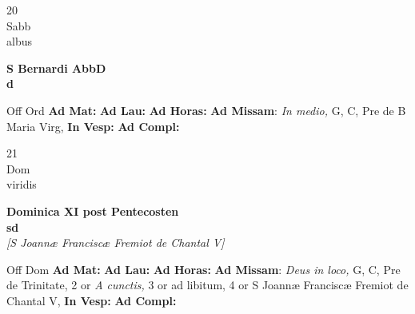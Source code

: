 \documentclass[10pt, openany]{book}
\begin{document}
        \begin{center}
            \begin{minipage}{3.5in}
                \vspace{2em}
                \begin{minipage}{0.5in}
                    {\Huge 20} \\
                    {\normalsize Sabb} \\
                    {\normalsize albus}
                \end{minipage}
                \begin{minipage}{3.0in}
                    \textbf{ \large S Bernardi AbbD \\
                    \textnormal{\normalsize d}} \\ 
                \end{minipage}
                \begin{justify}Off Ord
                    \textbf{Ad Mat: }
                    \textbf{Ad Lau: }
                    \textbf{Ad Horas: }\textbf{Ad Missam}: \textit{In medio,} G, C, Pre de B Maria Virg,  
                    \textbf{In Vesp: }
                    \textbf{Ad Compl: }
                \end{justify}
            \end{minipage}
        \end{center}
    
        \begin{center}
            \begin{minipage}{3.5in}
                \vspace{2em}
                \begin{minipage}{0.5in}
                    {\Huge 21} \\
                    {\normalsize Dom} \\
                    {\normalsize viridis}
                \end{minipage}
                \begin{minipage}{3.0in}
                    \textbf{ \large Dominica XI post Pentecosten \\
                    \textnormal{\normalsize sd}} \\ \textit{[S Joannæ Franciscæ Fremiot de Chantal V]} \\ 
                \end{minipage}
                \begin{justify}Off Dom
                    \textbf{Ad Mat: }
                    \textbf{Ad Lau: }
                    \textbf{Ad Horas: }\textbf{Ad Missam}: \textit{Deus in loco,} G, C, Pre de Trinitate, 2 or \textit{A cunctis,} 3 or ad libitum, 4 or S Joannæ Franciscæ Fremiot de Chantal V,  
                    \textbf{In Vesp: }
                    \textbf{Ad Compl: }
                \end{justify}
            \end{minipage}
        \end{center}
    
\end{document}
